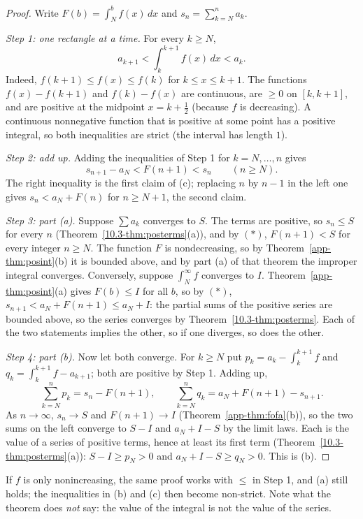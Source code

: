 \documentclass[11pt]{article}
\begin{document}
\begin{proof}
Write $F(b)=\int_N^bf(x)\,dx$ and $s_n=\sum_{k=N}^na_k$.

\emph{Step 1: one rectangle at a time.} For every $k\ge N$,
\[
a_{k+1}<\int_k^{k+1}f(x)\,dx<a_k .
\]
Indeed, $f(k+1)\le f(x)\le f(k)$ for $k\le x\le k+1$. The functions $f(x)-f(k+1)$ and $f(k)-f(x)$ are continuous, are $\ge0$ on $[k,k+1]$, and are positive at the midpoint $x=k+\frac12$ (because $f$ is decreasing). A continuous nonnegative function that is positive at some point has a positive integral, so both inequalities are strict (the interval has length $1$).

\emph{Step 2: add up.} Adding the inequalities of Step 1 for $k=N,\dots,n$ gives
\[
s_{n+1}-a_N<F(n+1)<s_n\qquad(n\ge N).\tag{$*$}
\]
The right inequality is the first claim of (c); replacing $n$ by $n-1$ in the left one gives $s_n<a_N+F(n)$ for $n\ge N+1$, the second claim.

\emph{Step 3: part (a).} Suppose $\sum a_k$ converges to $S$. The terms are positive, so $s_n\le S$ for every $n$ (Theorem~\ref{10.3-thm:posterms}(a)), and by $(*)$, $F(n+1)<S$ for every integer $n\ge N$. The function $F$ is nondecreasing, so by Theorem~\ref{app-thm:posint}(b) it is bounded above, and by part (a) of that theorem the improper integral converges. Conversely, suppose $\int_N^\infty f$ converges to $I$. Theorem~\ref{app-thm:posint}(a) gives $F(b)\le I$ for all $b$, so by $(*)$, $s_{n+1}<a_N+F(n+1)\le a_N+I$: the partial sums of the positive series are bounded above, so the series converges by Theorem~\ref{10.3-thm:posterms}. Each of the two statements implies the other, so if one diverges, so does the other.

\emph{Step 4: part (b).} Now let both converge. For $k\ge N$ put $p_k=a_k-\int_k^{k+1}f$ and $q_k=\int_k^{k+1}f-a_{k+1}$; both are positive by Step 1. Adding up,
\[
\sum_{k=N}^np_k=s_n-F(n+1),\qquad\sum_{k=N}^nq_k=a_N+F(n+1)-s_{n+1}.
\]
As $n\to\infty$, $s_n\to S$ and $F(n+1)\to I$ (Theorem~\ref{app-thm:fofa}(b)), so the two sums on the left converge to $S-I$ and $a_N+I-S$ by the limit laws. Each is the value of a series of positive terms, hence at least its first term (Theorem~\ref{10.3-thm:posterms}(a)): $S-I\ge p_N>0$ and $a_N+I-S\ge q_N>0$. This is (b).
\end{proof}

If $f$ is only nonincreasing, the same proof works with $\le$ in Step 1, and (a) still holds; the inequalities in (b) and (c) then become non-strict. Note what the theorem does \emph{not} say: the value of the integral is not the value of the series.
\end{document}
